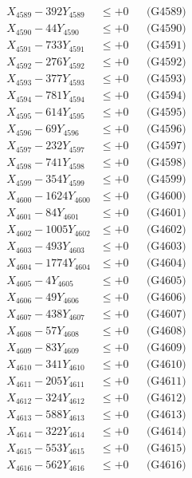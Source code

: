 \documentclass[a4paper,10pt]{article}
\begin{document}
{\begin{align}
X_{4589} - 392Y_{4589} &\leq +0 && \text{(G4589)} \\
X_{4590} - 44Y_{4590} &\leq +0 && \text{(G4590)} \\
\allowbreak
X_{4591} - 733Y_{4591} &\leq +0 && \text{(G4591)} \\
X_{4592} - 276Y_{4592} &\leq +0 && \text{(G4592)} \\
X_{4593} - 377Y_{4593} &\leq +0 && \text{(G4593)} \\
X_{4594} - 781Y_{4594} &\leq +0 && \text{(G4594)} \\
X_{4595} - 614Y_{4595} &\leq +0 && \text{(G4595)} \\
X_{4596} - 69Y_{4596} &\leq +0 && \text{(G4596)} \\
X_{4597} - 232Y_{4597} &\leq +0 && \text{(G4597)} \\
X_{4598} - 741Y_{4598} &\leq +0 && \text{(G4598)} \\
X_{4599} - 354Y_{4599} &\leq +0 && \text{(G4599)} \\
X_{4600} - 1624Y_{4600} &\leq +0 && \text{(G4600)} \\
\allowbreak
X_{4601} - 84Y_{4601} &\leq +0 && \text{(G4601)} \\
X_{4602} - 1005Y_{4602} &\leq +0 && \text{(G4602)} \\
X_{4603} - 493Y_{4603} &\leq +0 && \text{(G4603)} \\
X_{4604} - 1774Y_{4604} &\leq +0 && \text{(G4604)} \\
X_{4605} - 4Y_{4605} &\leq +0 && \text{(G4605)} \\
X_{4606} - 49Y_{4606} &\leq +0 && \text{(G4606)} \\
X_{4607} - 438Y_{4607} &\leq +0 && \text{(G4607)} \\
X_{4608} - 57Y_{4608} &\leq +0 && \text{(G4608)} \\
X_{4609} - 83Y_{4609} &\leq +0 && \text{(G4609)} \\
X_{4610} - 341Y_{4610} &\leq +0 && \text{(G4610)} \\
\allowbreak
X_{4611} - 205Y_{4611} &\leq +0 && \text{(G4611)} \\
X_{4612} - 324Y_{4612} &\leq +0 && \text{(G4612)} \\
X_{4613} - 588Y_{4613} &\leq +0 && \text{(G4613)} \\
X_{4614} - 322Y_{4614} &\leq +0 && \text{(G4614)} \\
X_{4615} - 553Y_{4615} &\leq +0 && \text{(G4615)} \\
X_{4616} - 562Y_{4616} &\leq +0 && \text{(G4616)} \\

\end{align}}
\end{document}
